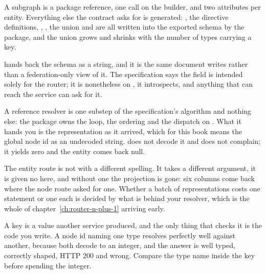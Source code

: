 \begin{chaptersummary}
  \item A subgraph is a package reference, one call on the builder, and two
        attributes per entity. Everything else the contract asks for is
        generated: , the directive definitions, ,
        , the  union and  are all
        written into the exported schema by the package, and the union grows
        and shrinks with the number of types carrying a key.
  \item {} hands back the schema as a string, and it is the same
        document  writes rather than a federation-only view
        of it. The specification says the field is intended solely for the
        router; it is nonetheless on , it introspects, and anything
        that can reach the service can ask for it.
  \item A reference resolver is one substep of the specification's algorithm and
        nothing else: the package owns the loop, the ordering and the dispatch
        on . What it hands you is the representation as it
        arrived, which for this book means the global node id as an undecoded
        string. \code{[ID<T>]} does not decode it and does not complain; it
        yields zero and the entity comes back null.
  \item The entity route is not  with a different spelling. It
        takes a different argument, it is given no
         here, and without one the projection is gone: six
        columns come back where the node route asked for one. Whether a batch
        of representations costs one statement or one each is decided by what
        is behind your resolver, which is the whole of
        chapter~\ref{ch:router-n-plus-1} arriving early.
  \item A key is a value another service produced, and the only thing that
        checks it is the code you write. A node id naming one type resolves
        perfectly well against another, because both decode to an integer, and
        the answer is well typed, correctly shaped, HTTP 200 and wrong. Compare
        the type name inside the key before spending the integer.
\end{chaptersummary}
